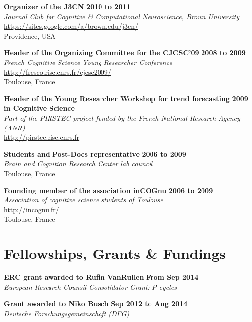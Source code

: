 \documentclass[margin,line]{resume}
\begin{document}
\begin{resume}
	\textbf{Organizer of the J3CN} \hfill \textbf{2010 to 2011}\\
	\textsl{Journal Club for Cognitive \& Computational Neuroscience, Brown University}\\
	 \url{https://sites.google.com/a/brown.edu/j3cn/}\\
	Providence, USA	

		\newpage
		
	\textbf{Header of the Organizing Committee for the CJCSC'09} \hfill \textbf{2008 to 2009}\\
	\textsl{French Cognitive Science Young Researcher Conference}\\
	 \url{http://fresco.risc.cnrs.fr/cjcsc2009/}\\
	Toulouse, France		
		
	\textbf{Header of the Young Researcher Workshop for trend forecasting} \hfill \textbf{2009}\\
	 \textbf{in Cognitive Science}\\
	\textsl{Part of the PIRSTEC project funded by the French National Research Agency (ANR)}\\
	 \url{http://pirstec.risc.cnrs.fr}
	 

	\textbf{Students and Post-Docs representative} \hfill \textbf{2006 to 2009}\\
	\textsl{Brain and Cognition Research Center lab council}\\
	Toulouse, France	

	\textbf{Founding member of the association inCOGnu} \hfill \textbf{2006 to 2009}\\
	\textsl{Association of cognitive science students of Toulouse}\\
	 \url{http://incognu.fr/}\\
	Toulouse, France


	\vspace{3mm}
	\section{\mysidestyle Fellowships, Grants \& Fundings}

	\textbf{ERC grant awarded to Rufin VanRullen} \hfill \textbf{From Sep 2014}\\
	\textsl{European Research Counsil Consolidator Grant: P-cycles}

	\textbf{Grant awarded to Niko Busch} \hfill \textbf{Sep 2012 to Aug 2014}\\
	\textsl{Deutsche Forschungsgemeinschaft (DFG)}


\end{resume}
\end{document}
